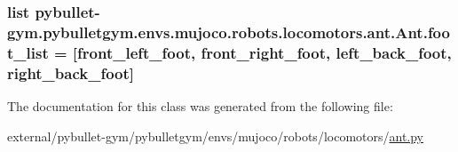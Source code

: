 \subsubsection[{\texorpdfstring{foot\+\_\+list}{foot_list}}]{\setlength{\rightskip}{0pt plus 5cm}list pybullet-\/gym.\+pybulletgym.\+envs.\+mujoco.\+robots.\+locomotors.\+ant.\+Ant.\+foot\+\_\+list = \mbox{[}\textquotesingle{}front\+\_\+left\+\_\+foot\textquotesingle{}, \textquotesingle{}front\+\_\+right\+\_\+foot\textquotesingle{}, \textquotesingle{}left\+\_\+back\+\_\+foot\textquotesingle{}, \textquotesingle{}right\+\_\+back\+\_\+foot\textquotesingle{}\mbox{]}\hspace{0.3cm}{\ttfamily [static]}}\hypertarget{classpybullet-gym_1_1pybulletgym_1_1envs_1_1mujoco_1_1robots_1_1locomotors_1_1ant_1_1_ant_a1b6008b9487bfec67ac275af31b13547}{}\label{classpybullet-gym_1_1pybulletgym_1_1envs_1_1mujoco_1_1robots_1_1locomotors_1_1ant_1_1_ant_a1b6008b9487bfec67ac275af31b13547}


The documentation for this class was generated from the following file\+:\begin{DoxyCompactItemize}
\item 
external/pybullet-\/gym/pybulletgym/envs/mujoco/robots/locomotors/\hyperlink{mujoco_2robots_2locomotors_2ant_8py}{ant.\+py}\end{DoxyCompactItemize}
